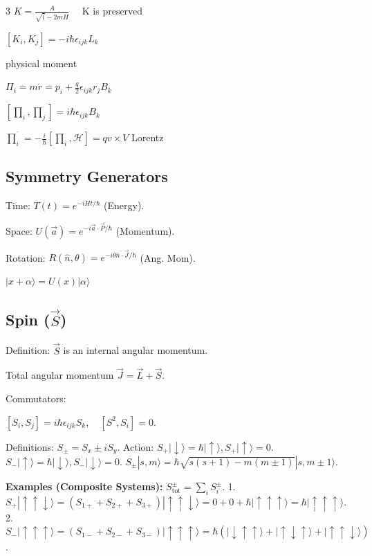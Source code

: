 \documentclass[10pt,a4paper]{article}
\begin{document}
\begin{multicols*}{3}
$K=\frac{A}{\sqrt(-2mH}\quad$ K is preserved

$[K_i,K_j]=-i\hbar\epsilon_{ijk}L_k$


physical moment 

$\Pi_i = m\dot{r} = p_i + \frac{q}{2}\epsilon_{ijk}r_j B_k$

$[\prod_i,\prod_j] = i\hbar\epsilon_{ijk}B_k$

$\dot{\prod_i} = -\frac{i}{\hbar}[\prod_i,\mathcal{H}] = qv\times V$ Lorentz

\subsection*{Symmetry Generators}
Time: $T(t) = e^{-iHt/\hbar}$ (Energy).

Space: $U(\vec{a}) = e^{-i\vec{a}\cdot\vec{P}/\hbar}$ (Momentum).

Rotation: $R(\hat{n}, \theta) = e^{-i\theta \hat{n}\cdot\vec{J}/\hbar}$ (Ang. Mom).

$|x+\alpha\rangle=U(x)|\alpha\rangle$

\subsection*{Spin ($\vec{S}$)}
Definition: $\vec{S}$ is an internal angular momentum. 

Total angular momentum $\vec{J} = \vec{L} + \vec{S}$.

Commutators: 

$[S_i, S_j] = i\hbar \epsilon_{ijk} S_k, \quad [S^2, S_i] = 0$.

Definitions: $S_\pm = S_x \pm iS_y$.
Action: $S_+ |\downarrow\rangle = \hbar |\uparrow\rangle, S_+ |\uparrow\rangle = 0$. \quad $S_- |\uparrow\rangle = \hbar |\downarrow\rangle, S_- |\downarrow\rangle = 0$.
$S_\pm |s, m\rangle = \hbar\sqrt{s(s+1) - m(m\pm 1)} |s, m\pm 1\rangle$.

\textbf{Examples (Composite Systems):}
$S_{\text{tot}}^\pm = \sum_i S_i^\pm$.
1. $S_+ |\uparrow \uparrow \downarrow\rangle = (S_{1+} + S_{2+} + S_{3+}) |\uparrow \uparrow \downarrow\rangle = 0 + 0 + \hbar |\uparrow \uparrow \uparrow\rangle = \hbar |\uparrow \uparrow \uparrow\rangle$.
2. $S_- |\uparrow \uparrow \uparrow\rangle = (S_{1-} + S_{2-} + S_{3-}) |\uparrow \uparrow \uparrow\rangle = \hbar (|\downarrow \uparrow \uparrow\rangle + |\uparrow \downarrow \uparrow\rangle + |\uparrow \uparrow \downarrow\rangle)$.


\end{multicols*}
\end{document}
